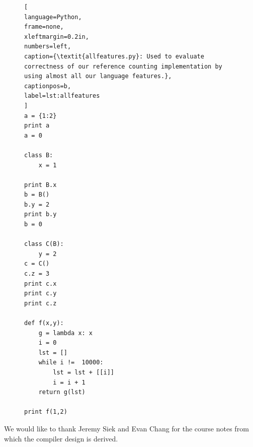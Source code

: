 \documentclass{sigplanconf}
\begin{document}
\begin{figure}[h]
\begin{lstlisting}[
language=Python,
frame=none,
xleftmargin=0.2in,
numbers=left,
caption={\textit{allfeatures.py}: Used to evaluate correctness of our reference counting implementation by using almost all our language features.},
captionpos=b,
label=lst:allfeatures
]
a = {1:2}
print a
a = 0

class B:
    x = 1

print B.x
b = B()
b.y = 2
print b.y
b = 0

class C(B):
    y = 2
c = C()
c.z = 3
print c.x
print c.y
print c.z

def f(x,y):
    g = lambda x: x
    i = 0
    lst = []
    while i !=  10000:
        lst = lst + [[i]]
        i = i + 1
    return g(lst)

print f(1,2)
\end{lstlisting}
\end{figure}


\acks

We would like to thank Jeremy Siek and Evan Chang for the course notes from which the compiler design is derived.




\end{document}
